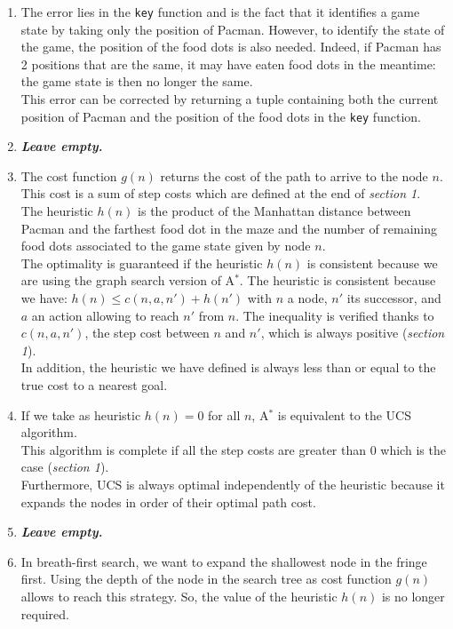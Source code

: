 \documentclass{article}
\begin{document}
\begin{enumerate}[label=\alph*.,leftmargin=1.35em]
    \item The error lies in the \texttt{key} function and is the fact that it identifies a game state by taking only the position of Pacman. However, to identify the state of the game, the position of the food dots is also needed. Indeed, if Pacman has 2 positions that are the same, it may have eaten food dots in the meantime: the game state is then no longer the same.\\
          This error can be corrected by returning a tuple containing both the current position of Pacman and the position of the food dots in the \texttt{key} function.  
    \item \textbf{{\it Leave empty.}}
    \item The cost function $g(n)$ returns the cost of the path to arrive to the node $n$. This cost is a sum of step costs which are defined at the end of \textit{section 1}.\\
    The heuristic $h(n)$ is the product of the Manhattan distance between Pacman and the farthest food dot in the maze and the number of remaining food dots associated to the game state given by node $n$.\\
    The optimality is guaranteed if the heuristic $h(n)$ is consistent because we are using the graph search version of A$^*$. The heuristic is consistent because we have: $h(n) \leq c(n,a,n') + h(n')$ with $n$ a node, $n'$ its successor, and $a$ an action allowing to reach $n'$ from $n$. The inequality is verified thanks to $c(n,a,n')$, the step cost between $n$ and $n'$, which is always positive (\textit{section 1}).\\
    In addition, the heuristic we have defined is always less than or equal to the true cost to a nearest goal.
    \item If we take as heuristic $h(n) = 0$ for all $n$, A$^*$ is equivalent to the UCS algorithm.\\
    This algorithm is complete if all the step costs are greater than 0 which is the case (\textit{section 1}).\\
    Furthermore, UCS is always optimal independently of the heuristic because it expands the nodes in order of their optimal path cost.
    \item \textbf{{\it Leave empty.}}
    \item In breath-first search, we want to expand the shallowest node in the fringe first. Using the depth of the node in the search tree as cost function $g(n)$ allows to reach this strategy. So, the value of the heuristic $h(n)$ is no longer required.
\end{enumerate}
\end{document}
